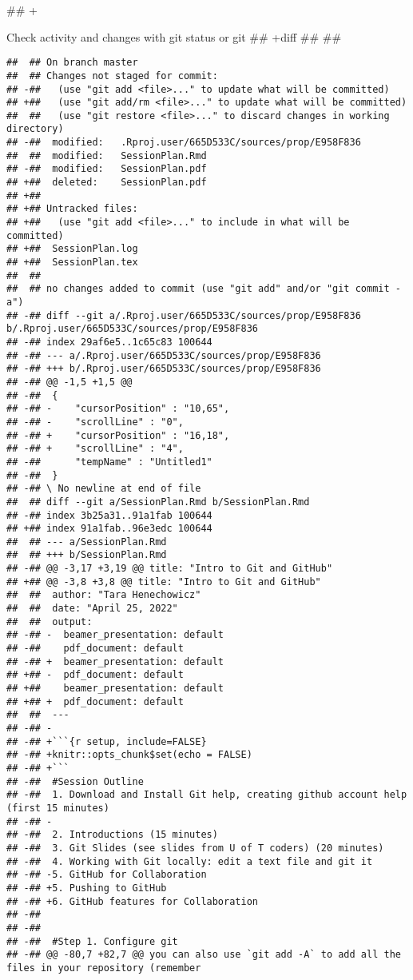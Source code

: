 \documentclass[ignorenonframetext,]{beamer}
\begin{document}
## +\begin{frame}[fragile]{Check activity and changes with git status or git
## +diff}
##  
##  \begin{verbatim}
##  ## On branch master
##  ## Changes not staged for commit:
## -##   (use "git add <file>..." to update what will be committed)
## +##   (use "git add/rm <file>..." to update what will be committed)
##  ##   (use "git restore <file>..." to discard changes in working directory)
## -##  modified:   .Rproj.user/665D533C/sources/prop/E958F836
##  ##  modified:   SessionPlan.Rmd
## -##  modified:   SessionPlan.pdf
## +##  deleted:    SessionPlan.pdf
## +## 
## +## Untracked files:
## +##   (use "git add <file>..." to include in what will be committed)
## +##  SessionPlan.log
## +##  SessionPlan.tex
##  ## 
##  ## no changes added to commit (use "git add" and/or "git commit -a")
## -## diff --git a/.Rproj.user/665D533C/sources/prop/E958F836 b/.Rproj.user/665D533C/sources/prop/E958F836
## -## index 29af6e5..1c65c83 100644
## -## --- a/.Rproj.user/665D533C/sources/prop/E958F836
## -## +++ b/.Rproj.user/665D533C/sources/prop/E958F836
## -## @@ -1,5 +1,5 @@
## -##  {
## -## -    "cursorPosition" : "10,65",
## -## -    "scrollLine" : "0",
## -## +    "cursorPosition" : "16,18",
## -## +    "scrollLine" : "4",
## -##      "tempName" : "Untitled1"
## -##  }
## -## \ No newline at end of file
##  ## diff --git a/SessionPlan.Rmd b/SessionPlan.Rmd
## -## index 3b25a31..91a1fab 100644
## +## index 91a1fab..96e3edc 100644
##  ## --- a/SessionPlan.Rmd
##  ## +++ b/SessionPlan.Rmd
## -## @@ -3,17 +3,19 @@ title: "Intro to Git and GitHub"
## +## @@ -3,8 +3,8 @@ title: "Intro to Git and GitHub"
##  ##  author: "Tara Henechowicz"
##  ##  date: "April 25, 2022"
##  ##  output:
## -## -  beamer_presentation: default
## -##    pdf_document: default
## -## +  beamer_presentation: default
## +## -  pdf_document: default
## +##    beamer_presentation: default
## +## +  pdf_document: default
##  ##  ---
## -## -
## -## +```{r setup, include=FALSE}
## -## +knitr::opts_chunk$set(echo = FALSE)
## -## +```
## -##  #Session Outline
## -##  1. Download and Install Git help, creating github account help (first 15 minutes)
## -## -
## -##  2. Introductions (15 minutes)
## -##  3. Git Slides (see slides from U of T coders) (20 minutes)
## -##  4. Working with Git locally: edit a text file and git it
## -## -5. GitHub for Collaboration
## -## +5. Pushing to GitHub
## -## +6. GitHub features for Collaboration
## -##  
## -##    
## -##  #Step 1. Configure git
## -## @@ -80,7 +82,7 @@ you can also use `git add -A` to add all the files in your repository (remember

\end{verbatim}
\end{frame}
\end{document}
